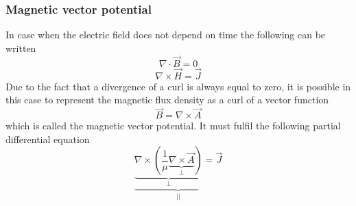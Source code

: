 \subsubsection{Magnetic vector potential}
In case when the electric field does not depend on time the following can be written
\begin{equation*}
	\nabla \cdot \vec{B} = 0
\end{equation*}
\begin{equation*}
	\nabla \times \vec{H} = \vec{J}
\end{equation*}
Due to the fact that a divergence of a curl is always equal to zero, it is possible in this case to represent the magnetic flux density as a curl of a vector function 
\begin{equation*}
	\vec{B} = \nabla \times \vec{A}
\end{equation*}
which is called the magnetic vector potential. It must fulfil the following partial differential equation
\begin{equation*}
	\underbrace{\underbrace{\nabla \times \left(\frac{1}{\mu}\underbrace{\nabla \times \vec{A}}_{\bot}\right)}_{\bot} = \vec{J}}_{||}
\end{equation*}